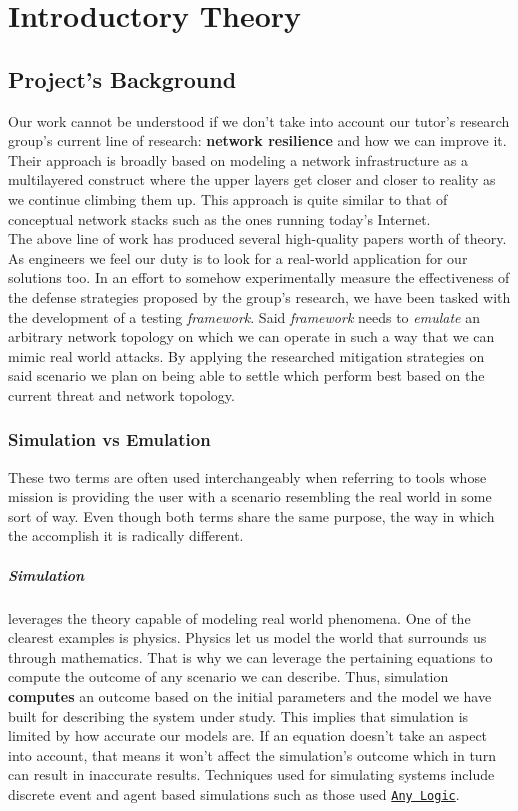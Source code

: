 \chapter{Introductory Theory}
    \section{Project's Background}
        Our work cannot be understood if we don't take into account our tutor's research group's current line of research: \textbf{network resilience} and how we can improve it. Their approach is broadly based on modeling a network infrastructure as a multilayered construct where the upper layers get closer and closer to reality as we continue climbing them up. This approach is quite similar to that of conceptual network stacks such as the ones running today's Internet.\\

        The above line of work has produced several high-quality papers worth of theory. As engineers we feel our duty is to look for a real-world application for our solutions too. In an effort to somehow experimentally measure the effectiveness of the defense strategies proposed by the group's research, we have been tasked with the development of a testing \textit{framework}. Said \textit{framework} needs to \textit{emulate} an arbitrary network topology on which we can operate in such a way that we can mimic real world attacks. By applying the researched mitigation strategies on said scenario we plan on being able to settle which perform best based on the current threat and network topology.\\

        \subsection{Simulation vs Emulation}
            These two terms are often used interchangeably when referring to tools whose mission is providing the user with a scenario resembling the real world in some sort of way. Even though both terms share the same purpose, the way in which the accomplish it is radically different.\\

            \paragraph{Simulation} leverages the theory capable of modeling real world phenomena. One of the clearest examples is physics. Physics let us model the world that surrounds us through mathematics. That is why we can leverage the pertaining equations to compute the outcome of any scenario we can describe. Thus, simulation \textbf{computes} an outcome based on the initial parameters and the model we have built for describing the system under study. This implies that simulation is limited by how accurate our models are. If an equation doesn't take an aspect into account, that means it won't affect the simulation's outcome which in turn can result in inaccurate results. Techniques used for simulating systems include discrete event and agent based simulations such as those used \href{https://www.anylogic.com}{\texttt{Any Logic}}.\\

